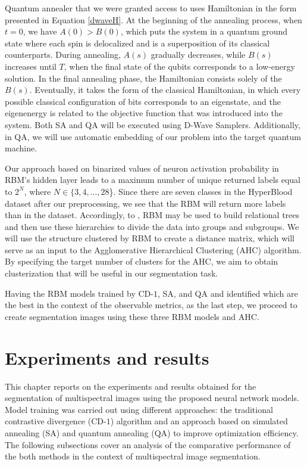 \documentclass[a4paper,12pt]{article}
\begin{document}
Quantum annealer that we were granted access to uses Hamiltonian in the form presented in Equation \eqref{dwaveH}. At the beginning of the annealing process, when $t=0$, we have $A(0)>B(0)$, which puts the system in a quantum ground state where each spin is delocalized and is a superposition of its classical counterparts. During annealing, $A(s)$ gradually decreases, while $B(s)$ increases until $T$, when the final state of the qubits corresponds to a low-energy solution. In the final annealing phase, the Hamiltonian consists solely of the $B(s)$. Eventually, it takes the form of the classical Hamiltonian, in which every possible classical configuration of bits corresponds to an eigenstate, and the eigenenergy is related to the objective function that was introduced into the system. Both SA and QA will be executed using D-Wave Samplers. Additionally, in QA, we will use automatic embedding of our problem into the target quantum machine.

Our approach based on binarized values of neuron activation probability in RBM's hidden layer leads to a maximum number of unique returned labels equal to $2^N$, where $N \in \{3,4,\ldots,28$\}. Since there are seven classes in the HyperBlood dataset after our preprocessing, we see that the RBM will return more labels than in the dataset. Accordingly, to \cite{Decelle2023}, RBM may be used to build relational trees and then use these hierarchies to divide the data into groups and subgroups. We will use the structure clustered by RBM to create a distance matrix, which will serve as an input to the Agglomerative Hierarchical Clustering (AHC) algorithm. By specifying the target number of clusters for the AHC, we aim to obtain clusterization that will be useful in our segmentation task.

Having the RBM models trained by CD-$1$, SA, and QA and identified which are the best in the context of the observable metrics, as the last step, we proceed to create segmentation images using these three RBM models and AHC.

\section{Experiments and results}\label{experiments_and_results}
This chapter reports on the experiments and results obtained for the segmentation of multispectral images using the proposed neural network models. Model training was carried out using different approaches: the traditional contrastive divergence (CD-$1$) algorithm and an approach based on simulated annealing (SA) and quantum annealing (QA) to improve optimization efficiency. The following subsections cover an analysis of the comparative performance of the both methods in the context of multispectral image segmentation.
\end{document}
